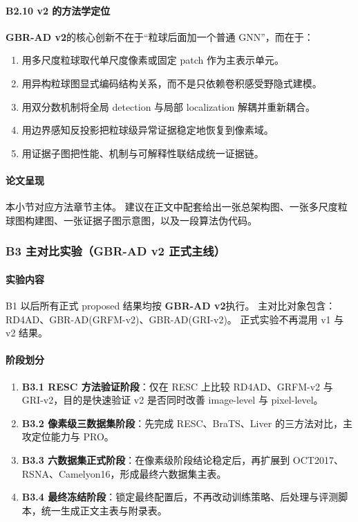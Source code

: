 \documentclass[UTF8,a4paper]{ctexart}
\newcommand{\gbrvtwo}{\textbf{GBR-AD v2}}
\begin{document}
\paragraph{B2.10 v2 的方法学定位}
\gbrvtwo 的核心创新不在于“粒球后面加一个普通 GNN”，而在于：
\begin{enumerate}
  \item 用多尺度粒球取代单尺度像素或固定 patch 作为主表示单元。
  \item 用异构粒球图显式编码结构关系，而不是只依赖卷积感受野隐式建模。
  \item 用双分数机制将全局 detection 与局部 localization 解耦并重新耦合。
  \item 用边界感知反投影把粒球级异常证据稳定地恢复到像素域。
  \item 用证据子图把性能、机制与可解释性联结成统一证据链。
\end{enumerate}

\paragraph{论文呈现}
本小节对应方法章节主体。
建议在正文中配套给出一张总架构图、一张多尺度粒球图构建图、一张证据子图示意图，以及一段算法伪代码。

\subsubsection{B3 主对比实验（GBR-AD v2 正式主线）}

\paragraph{实验内容}
B1 以后所有正式 proposed 结果均按 \gbrvtwo 执行。
主对比对象包含：RD4AD、GBR-AD(GRFM-v2)、GBR-AD(GRI-v2)。
正式实验不再混用 v1 与 v2 结果。

\paragraph{阶段划分}
\begin{enumerate}
  \item \textbf{B3.1 RESC 方法验证阶段}：仅在 RESC 上比较 RD4AD、GRFM-v2 与 GRI-v2，目的是快速验证 v2 是否同时改善 image-level 与 pixel-level。
  \item \textbf{B3.2 像素级三数据集阶段}：先完成 RESC、BraTS、Liver 的三方法对比，主攻定位能力与 PRO。
  \item \textbf{B3.3 六数据集正式阶段}：在像素级阶段结论稳定后，再扩展到 OCT2017、RSNA、Camelyon16，形成最终六数据集主表。
  \item \textbf{B3.4 最终冻结阶段}：锁定最终配置后，不再改动训练策略、后处理与评测脚本，统一生成正文主表与附录表。
\end{enumerate}
\end{document}
